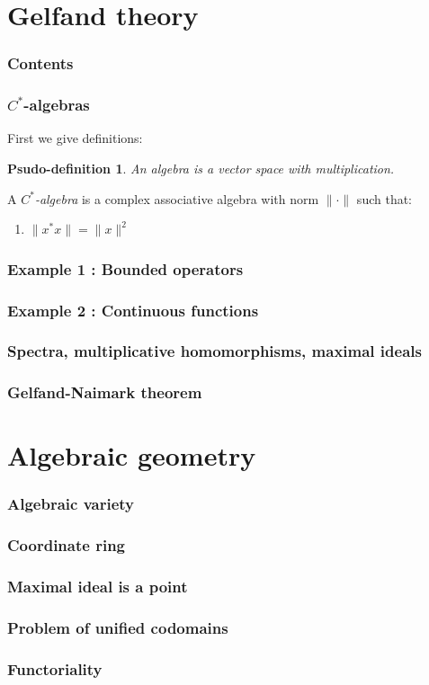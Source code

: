 \documentclass{beamer}
\begin{document}
\section{Gelfand theory}
\begin{frame}
\frametitle{Contents}
  \tableofcontents[currentsection]
\end{frame}

\newtheorem{pdefn}{Psudo-definition}
\begin{frame}
\frametitle{$C^*$-algebras}

First we give definitions:
  \begin{pdefn}
    An algebra is a vector space with multiplication.
  \end{pdefn}
  \begin{defn}
    A \emph{$C^*$-algebra} is a complex associative algebra with norm $\|\cdot\|$ such that:
    \begin{enumerate}
      \item $\|x^*x\|=\|x\|^2$
    \end{enumerate}

  \end{defn}
\end{frame}
\begin{frame}
\frametitle{Example 1 : Bounded operators}
\end{frame}
\begin{frame}
\frametitle{Example 2 : Continuous functions}
\end{frame}
\begin{frame}
\frametitle{Spectra, multiplicative homomorphisms, maximal ideals}
\end{frame}
\begin{frame}
\frametitle{Gelfand-Naimark theorem}
\end{frame}


\section{Algebraic geometry}
\begin{frame}
\frametitle{Algebraic variety}
\end{frame}
\begin{frame}
\frametitle{Coordinate ring}
\end{frame}
\begin{frame}
\frametitle{Maximal ideal is a point}
\end{frame}
\begin{frame}
\frametitle{Problem of unified codomains}
\end{frame}
\begin{frame}
\frametitle{Functoriality}
\end{frame}
\end{document}

